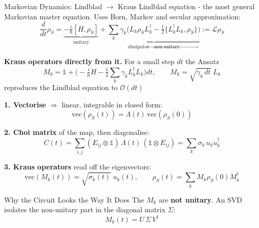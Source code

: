 \begin{frame}[t]{}
\begin{postercolumn}
  \begin{block}{Markovian Dynamics: Lindblad $\rightarrow$ Kraus}
    Lindblad equation - the most general Markovian master equation. Uses Born, Markov and secular approximation:
    \[ \frac{d}{dt}\rho_S = \underbrace{-\tfrac{i}{\hbar}[H,\rho_S]}_{\text{unitary}}
       + \underbrace{\sum_k \gamma_k \Big( L_k \rho_S L^\dagger_k
         - \tfrac12 \{ L^\dagger_k L_k, \rho_S \} \Big)}_{\text{dissipator} \rightarrow \text{non-unitary}} := \mathcal{L} \rho_S \]

    \textbf{Kraus operators directly from it.} For a small step $dt$ the
    Ansatz
    \[ M_0 = \mathbb{1} + \Big(-\tfrac{i}{\hbar}H
             - \tfrac12\sum_k \gamma_k L^\dagger_k L_k\Big) dt,
       \qquad M_k = \sqrt{\gamma_k\,dt}\;L_k \]
    reproduces the Lindblad equation to $\mathcal{O}(dt)$

    \textbf{1. Vectorise} $\Rightarrow$ linear, integrable in closed form:
    \[ \mathrm{vec}(\rho_S(t)) = \Lambda(t)\,\mathrm{vec}(\rho_S(0)) \]

    \textbf{2. Choi matrix} of the map, then diagonalise:
    \[ C(t) = \sum_{i,j}(E_{ij}\otimes \mathbb{1})\,\Lambda(t)\,(\mathbb{1} \otimes E_{ij})
            = \sum_k \sigma_k\, u_k u^\dagger_k \]

    \textbf{3. Kraus operators} read off the eigenvectors:
    \[ \mathrm{vec}(M_k(t)) = \sqrt{\sigma_k(t)}\; u_k(t),
       \qquad \rho_S(t) = \sum_k M_k \rho_S(0) M^\dagger_k \]
  \end{block}

  \begin{block}{Why the Circuit Looks the Way It Does}
    The $M_k$ are \textbf{not unitary}. An SVD isolates the non-unitary
    part in the diagonal matrix $\Sigma$:
    \[ M_k(t) = U\,\Sigma\,V^\dagger \]


\end{block}
\end{postercolumn}
\end{frame}
